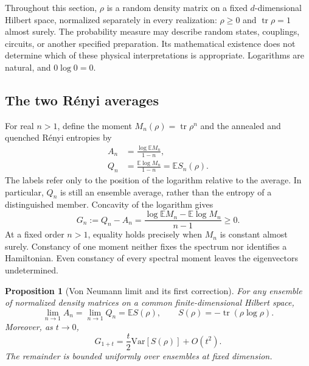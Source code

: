 \documentclass[11pt,letterpaper]{article}
\theoremstyle{plain}
\newtheorem{proposition}[theorem]{Proposition}
\theoremstyle{definition}
\theoremstyle{remark}
\newcommand{\E}{\mathbb{E}}
\newcommand{\Var}{\text{Var}}
\DeclareMathOperator{\tr}{tr}
\begin{document}
Throughout this section, $\rho$ is a random density matrix on a fixed
$d$-dimensional Hilbert space, normalized separately in every realization:
$\rho\geq0$ and $\tr\rho=1$ almost surely.  The probability measure may
describe random states, couplings, circuits, or another specified
preparation.  Its mathematical existence does not determine which of
these physical interpretations is appropriate.  Logarithms are natural,
and $0\log0=0$.

\subsection{The two R\'enyi averages}
\label{subsec06:why_matters}

For real $n>1$, define the moment $M_n(\rho)=\tr\rho^n$ and the
annealed and quenched R\'enyi entropies by
\begin{align}
 A_n&=\frac{\log\E M_n}{1-n},
 \label{eq06:annealed_def}\\
 Q_n&=\frac{\E\log M_n}{1-n}=\E S_n(\rho).
 \label{eq06:quenched_def}
\end{align}
The labels refer only to the position of the logarithm relative to the
average.  In particular, $Q_n$ is still an ensemble average, rather than
the entropy of a distinguished member.  Concavity of the logarithm gives
\begin{equation}
 G_n:=Q_n-A_n
 =\frac{\log\E M_n-\E\log M_n}{n-1}\geq0.
 \label{eq06:gap_def}
\end{equation}
At a fixed order $n>1$, equality holds precisely when $M_n$ is constant
almost surely.  Constancy of one moment neither fixes the spectrum nor
identifies a Hamiltonian.  Even constancy of every spectral moment leaves
the eigenvectors undetermined.

\begin{proposition}[Von Neumann limit and its first correction]
\label{prop06:von_neumann_limit}
For any ensemble of normalized density matrices on a common
finite-dimensional Hilbert space,
\begin{equation}
 \lim_{n\to1}A_n=\lim_{n\to1}Q_n=\E S(\rho),
 \qquad S(\rho)=-\tr(\rho\log\rho).
 \label{eq06:common_limit}
\end{equation}
Moreover, as $t\to0$,
\begin{equation}
 G_{1+t}=\frac{t}{2}\Var[S(\rho)]+O(t^2).
 \label{eq06:gap_formula}
\end{equation}
The remainder is bounded uniformly over ensembles at fixed dimension.
\end{proposition}
\end{document}
